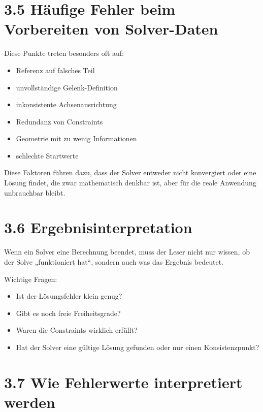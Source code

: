 \documentclass[
  12pt
]{book}
\providecommand{\tightlist}{%
  \setlength{\itemsep}{0pt}\setlength{\parskip}{0pt}}
\begin{document}
\hypertarget{huxe4ufige-fehler-beim-vorbereiten-von-solver-daten}{%
\section{\texorpdfstring{{3.5} Häufige Fehler beim Vorbereiten von
Solver-Daten}{3.5 Häufige Fehler beim Vorbereiten von Solver-Daten}}\label{huxe4ufige-fehler-beim-vorbereiten-von-solver-daten}}

Diese Punkte treten besonders oft auf:

\begin{itemize}
\tightlist
\item
  Referenz auf falsches Teil
\item
  unvollständige Gelenk-Definition
\item
  inkonsistente Achsenausrichtung
\item
  Redundanz von Constraints
\item
  Geometrie mit zu wenig Informationen
\item
  schlechte Startwerte
\end{itemize}

Diese Faktoren führen dazu, dass der Solver entweder nicht konvergiert
oder eine Lösung findet, die zwar mathematisch denkbar ist, aber für die
reale Anwendung unbrauchbar bleibt.

\hypertarget{ergebnisinterpretation}{%
\section{\texorpdfstring{{3.6}
Ergebnisinterpretation}{3.6 Ergebnisinterpretation}}\label{ergebnisinterpretation}}

Wenn ein Solver eine Berechnung beendet, muss der Leser nicht nur
wissen, ob der Solve „funktioniert hat``, sondern auch was das Ergebnis
bedeutet.

Wichtige Fragen:

\begin{itemize}
\tightlist
\item
  Ist der Lösungsfehler klein genug?
\item
  Gibt es noch freie Freiheitsgrade?
\item
  Waren die Constraints wirklich erfüllt?
\item
  Hat der Solver eine gültige Lösung gefunden oder nur einen
  Konsistenzpunkt?
\end{itemize}

\hypertarget{wie-fehlerwerte-interpretiert-werden}{%
\section{\texorpdfstring{{3.7} Wie Fehlerwerte interpretiert
werden}{3.7 Wie Fehlerwerte interpretiert werden}}\label{wie-fehlerwerte-interpretiert-werden}}
\end{document}
